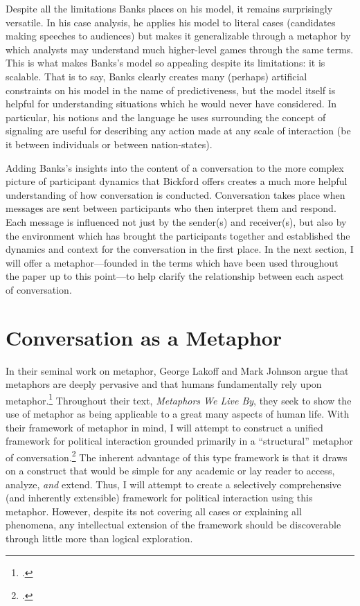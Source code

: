 \documentclass[openany,twoside]{memoir}
\begin{document}
\begin{Spacing}{2}
Despite all the limitations Banks places on his model, it remains surprisingly versatile. 
In his case analysis, he applies his model to literal cases (candidates making speeches to audiences) but makes it generalizable through a metaphor by which analysts may understand much higher-level games through the same terms. 
This is what makes Banks's model so appealing despite its limitations: it is scalable.
That is to say, Banks clearly creates many (perhaps) artificial constraints on his model in the name of predictiveness, but the model itself is helpful for understanding situations which he would never have considered.
In particular, his notions and the language he uses surrounding the concept of signaling are useful for describing any action made at any scale of interaction (be it between individuals or between nation-states).

Adding Banks's insights into the content of a conversation to the more complex picture of participant dynamics that Bickford offers creates a much more helpful understanding of how conversation is conducted.
Conversation takes place when messages are sent between participants who then interpret them and respond.
Each message is influenced not just by the sender(s) and receiver(s), but also by the environment which has brought the participants together and established the dynamics and context for the conversation in the first place.
In the next section, I will offer a metaphor---founded in the terms which have been used throughout the paper up to this point---to help clarify the relationship between each aspect of conversation.

\section{Conversation as a Metaphor}
In their seminal work on metaphor, George Lakoff and Mark Johnson argue that metaphors are deeply pervasive and that humans fundamentally rely upon metaphor.\footcite[3--6]{lakoffjohnson80}
Throughout their text, \emph{Metaphors We Live By}, they seek to show the use of metaphor as being applicable to a great many aspects of human life.
With their framework of metaphor in mind, I will attempt to construct a unified framework for political interaction grounded primarily in a ``structural'' metaphor of conversation.\footcite[14]{lakoffjohnson80} 
The inherent advantage of this type framework is that it draws on a construct that would be simple for any academic or lay reader to access, analyze, \emph{and} extend.
Thus, I will attempt to create a selectively comprehensive (and inherently extensible) framework for political interaction using this metaphor. 
However, despite its not covering all cases or explaining all phenomena, any intellectual extension of the framework should be discoverable through little more than logical exploration.


\end{Spacing}
\end{document}
